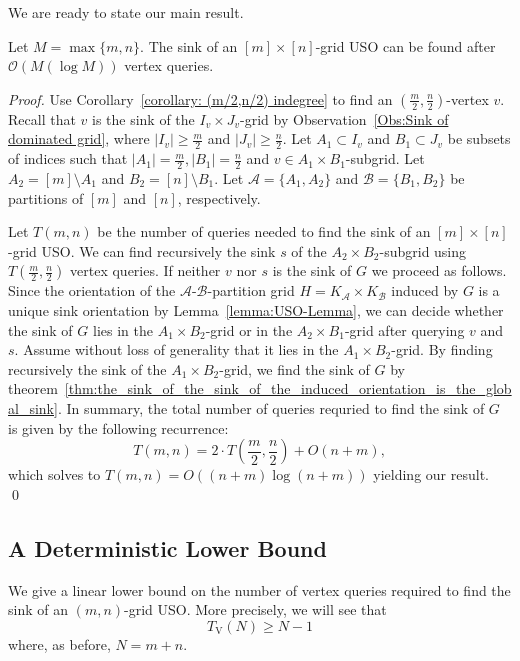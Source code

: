 \documentclass[runningheads,a4paper]{llncs}
\newcommand{\A}{\ensuremath{\mathcal A}}
\newcommand{\B}{\ensuremath{\mathcal B}}
\newcommand{\timeVertex}{\ensuremath{T_\mathrm{V}}}
\begin{document}
We are ready to state our main result. 
\begin{theorem}\label{theorem:Sink algorithm}
 Let $M = \max\{m,n\}$. The sink of an $[m]\times[n]$-grid USO can be found after $\mathcal{O}(M(\log M))$ vertex queries.
\end{theorem}
\begin{proof}
Use Corollary~\ref{corollary: (m/2,n/2) indegree} to find an $(\frac{m}{2}, \frac{n}{2})$-vertex $v$. 
Recall that $v$ is the sink of the $I_v\times J_v$-grid by Observation~\ref{Obs:Sink of dominated grid}, where $|I_v| \geq \frac{m}{2}$ and $|J_v|\geq \frac{n}{2}$. Let $A_1\subset I_v$ and $B_1\subset J_v$ be subsets of indices such that $|A_1| = \frac{m}{2}, |B_1| = \frac{n}{2}$ and $v\in A_1\times B_1$-subgrid.
Let $A_2= [m]\setminus A_1$ and $B_2 = [n]\setminus B_1$.
Let $\A = \{A_1, A_2\}$ and $\B = \{B_1, B_2\}$ be partitions of $[m]$ and $[n]$, respectively.

Let $T(m, n)$ be the number of queries needed to find the sink of an $[m]\times[n]$-grid USO.
We can find recursively the sink $s$ of the $A_2\times B_2$-subgrid using $T(\frac{m}{2}, \frac{n}{2})$ vertex queries. 
If neither $v$ nor $s$ is the sink of $G$ we proceed as follows.
Since the orientation of the $\A$-$\B$-partition grid $H = K_\A \times K_\B$ induced by $G$ is a unique sink orientation by Lemma~\ref{lemma:USO-Lemma}, we can decide whether the sink of $G$ lies in the $A_1\times B_2$-grid or in the $A_2\times B_1$-grid after querying $v$ and $s$. Assume without loss of generality that it lies in the $A_1\times B_2$-grid.
By finding recursively the sink of the $A_1\times B_2$-grid, we find the sink of $G$ by theorem~\ref{thm:the_sink_of_the_sink_of_the_induced_orientation_is_the_global_sink}. In summary, the total number of queries requried to find the sink of $G$ is given by the following recurrence:
$$T(m, n) = 2\cdot T\left(\frac{m}{2}, \frac{n}{2}\right) + O(n+m),$$
which solves to $T(m, n) = O((n+m) \log (n+m))$ yielding our result. \qed
\end{proof}
 
\subsection{A Deterministic Lower Bound}
\label{section:a_deterministic_lower_bound}

We give a linear lower bound on the number of vertex queries required to find
the sink of an $(m,n)$-grid USO.
More precisely, we will see that
\[
    \timeVertex(N) \ge N-1
\]
where, as before, $N = m+n$.
\end{document}
